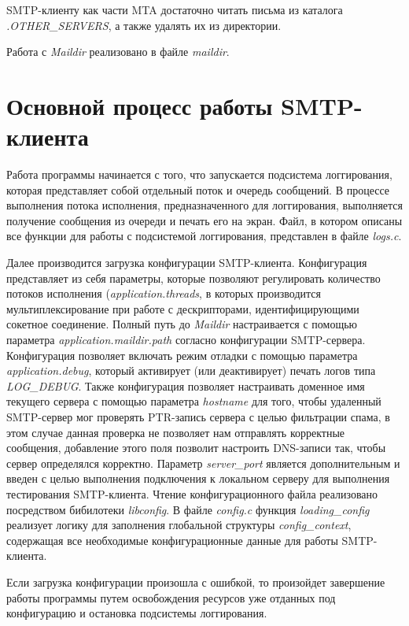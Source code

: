 \documentclass[a4paper,12pt]{report}
\begin{document}
	SMTP-клиенту как части MTA достаточно читать письма из каталога \textit{.OTHER\_SERVERS}, а также удалять их из директории.

    	Работа с \textit{Maildir} реализовано в файле \textit{maildir}.

	\section{Основной процесс работы SMTP-клиента}

	Работа программы начинается с того, что запускается подсистема логгирования, которая представляет собой отдельный поток и очередь сообщений. В процессе выполнения потока исполнения, предназначенного для логгирования, выполняется получение сообщения из очереди и печать его на экран. Файл, в котором описаны все функции для работы с подсистемой логгирования, представлен в файле \textit{logs.c}.

	Далее производится загрузка конфигурации SMTP-клиента. Конфигурация представляет из себя параметры, которые позволяют регулировать количество потоков исполнения (\textit{application.threads}, в которых производится мультиплексирование при работе с дескрипторами, идентифицирующими сокетное соединение. Полный путь до \textit{Maildir} настраивается с помощью параметра \textit{application.maildir.path} согласно конфигурации SMTP-сервера. Конфигурация позволяет включать режим отладки с помощью параметра \textit{application.debug}, который активирует (или деактивирует) печать логов типа \textit{LOG\_DEBUG}. Также конфигурация позволяет настраивать доменное имя текущего сервера с помощью параметра \textit{hostname} для того, чтобы удаленный SMTP-сервер мог проверять PTR-запись сервера с целью фильтрации спама, в этом случае данная проверка не позволяет нам отправлять корректные сообщения, добавление этого поля позволит настроить DNS-записи так, чтобы сервер определялся корректно. Параметр \textit{server\_port} является дополнительным и введен с целью выполнения подключения к локальном серверу для выполнения тестирования SMTP-клиента. Чтение конфигурационного файла реализовано посредством бибилотеки \textit{libconfig}. В файле \textit{config.c} функция \textit{loading\_config} реализует логику для заполнения глобальной структуры \textit{config\_context}, содержащая все необходимые конфигурационные данные для работы SMTP-клиента.


	Если загрузка конфигурации произошла с ошибкой, то произойдет завершение работы программы путем освобождения ресурсов уже отданных под конфигурацию и остановка подсистемы логгирования.
	
\end{document}
